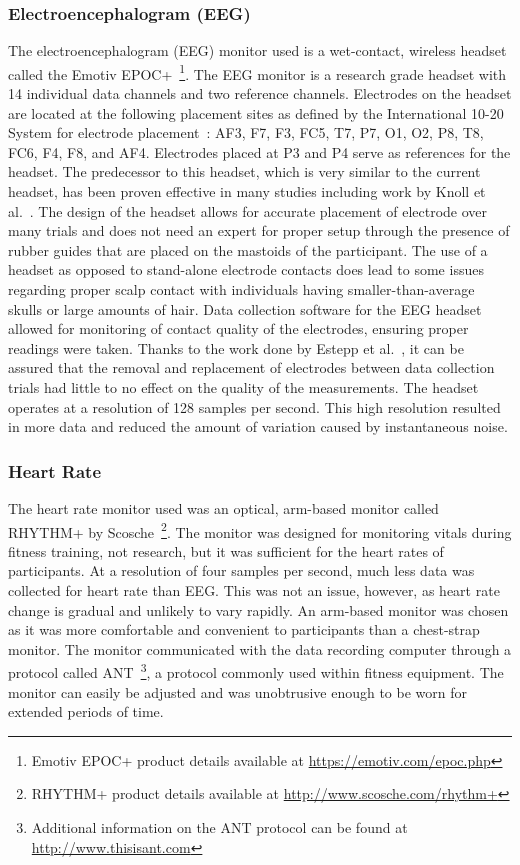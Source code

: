 \documentclass[11pt]{article}
\begin{document}
		\subsubsection{Electroencephalogram (EEG)}
		The electroencephalogram (EEG) monitor used is a wet-contact, wireless headset called the Emotiv EPOC+~\footnote{Emotiv EPOC+ product details available at \url{https://emotiv.com/epoc.php}}. The EEG monitor is a research grade headset with 14 individual data channels and two reference channels. Electrodes on the headset are located at the following placement sites as defined by the International 10-20 System for electrode placement~\cite{}: AF3, F7, F3, FC5, T7, P7, O1, O2, P8, T8, FC6, F4, F8, and AF4. Electrodes placed at P3 and P4 serve as references for the headset. The predecessor to this headset, which is very similar to the current headset, has been proven effective in many studies including work by Knoll et al.~\cite{}. The design of the headset allows for accurate placement of electrode over many trials and does not need an expert for proper setup through the presence of rubber guides that are placed on the mastoids of the participant. The use of a headset as opposed to stand-alone electrode contacts does lead to some issues regarding proper scalp contact with individuals having smaller-than-average skulls or large amounts of hair. Data collection software for the EEG headset allowed for monitoring of contact quality of the electrodes, ensuring proper readings were taken. Thanks to the work done by Estepp et al.~\cite{}, it can be assured that the removal and replacement of electrodes between data collection trials had little to no effect on the quality of the measurements. The headset operates at a resolution of 128 samples per second. This high resolution resulted in more data and reduced the amount of variation caused by instantaneous noise.
			
		\subsubsection{Heart Rate}
		The heart rate monitor used was an optical, arm-based monitor called RHYTHM+ by Scosche~\footnote{RHYTHM+ product details available at \url{http://www.scosche.com/rhythm+}}. The monitor was designed for monitoring vitals during fitness training, not research, but it was sufficient for the heart rates of participants. At a resolution of four samples per second, much less data was collected for heart rate than EEG. This was not an issue, however, as heart rate change is gradual and unlikely to vary rapidly. An arm-based monitor was chosen as it was more comfortable and convenient to participants than a chest-strap monitor. The monitor communicated with the data recording computer through a protocol called ANT~\footnote{Additional information on the ANT protocol can be found at \url{http://www.thisisant.com}}, a protocol commonly used within fitness equipment.  The monitor can easily be adjusted and was unobtrusive enough to be worn for extended periods of time.
		
\end{document}
